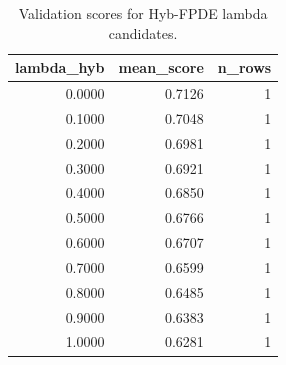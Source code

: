 \begin{table}[t]
\caption{Validation scores for Hyb-FPDE lambda candidates.}
\label{tab:lambda_distribution_computed}
\centering
\begin{tabular}{rrr}
\toprule
lambda\_hyb & mean\_score & n\_rows \\
\midrule
0.0000 & 0.7126 & 1 \\
0.1000 & 0.7048 & 1 \\
0.2000 & 0.6981 & 1 \\
0.3000 & 0.6921 & 1 \\
0.4000 & 0.6850 & 1 \\
0.5000 & 0.6766 & 1 \\
0.6000 & 0.6707 & 1 \\
0.7000 & 0.6599 & 1 \\
0.8000 & 0.6485 & 1 \\
0.9000 & 0.6383 & 1 \\
1.0000 & 0.6281 & 1 \\
\bottomrule
\end{tabular}

\end{table}
